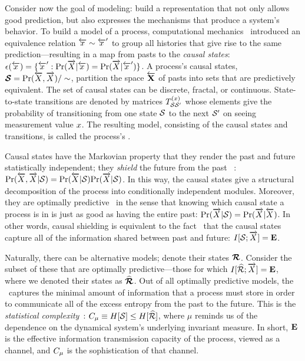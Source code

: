 \documentclass[prl,twocolumn,showpacs,superscriptaddress,preprintnumbers,floatfix]{revtex4}
\theoremstyle{plain}    \newtheorem{Lem}{Lemma}
\theoremstyle{plain}    \newtheorem*{ProLem}{Proof}
\theoremstyle{plain} 	\newtheorem{Cor}{Corollary}
\theoremstyle{plain} 	\newtheorem*{ProCor}{Proof}
\theoremstyle{plain} 	\newtheorem{The}{Theorem}
\theoremstyle{plain} 	\newtheorem*{ProThe}{Proof}
\theoremstyle{plain} 	\newtheorem{Prop}{Proposition}
\theoremstyle{plain} 	\newtheorem*{ProProp}{Proof}
\theoremstyle{plain} 	\newtheorem*{Conj}{Conjecture}
\theoremstyle{plain}	\newtheorem*{Rem}{Remark}
\theoremstyle{plain}	\newtheorem*{Def}{Definition}
\theoremstyle{plain}	\newtheorem*{Not}{Notation}
\begin{document}
Consider now the goal of modeling: build a representation that not only
allows good prediction, but also expresses the mechanisms that produce a
system's behavior. To build a model of a process,
computational mechanics~\cite{CompMechMerge} introduced an equivalence
relation ${\overleftarrow {{x}}} \sim {\overleftarrow { {x} }}^\prime$ to group all histories that give rise to the
same prediction---resulting in a map from pasts to the \emph{causal states}:
$\epsilon({\overleftarrow {{x}}}) =
  \{ {\overleftarrow {{x}}}^\prime: {\Pr}(\overrightarrow{{X}}|{\overleftarrow {{x}}}) = {\Pr}(\overrightarrow{{X}}|{\overleftarrow {{x}}}^\prime) \}$. 
A process's causal states, $\boldsymbol{\mathcal{S}} = {\Pr}(\overleftarrow {{X}},\overrightarrow{{X}}) / \sim$,
partition the space ${ \overleftarrow {\rm {\bf  {X} }} }$ of pasts into sets that are predictively
equivalent. The set of causal states can be discrete, fractal, or continuous.
State-to-state transitions are
denoted by matrices $T_{\mathcal{S} \mathcal{S}^\prime}^{(x)}$ whose elements
give the probability of transitioning from one state $\mathcal{S}$ to the
next $\mathcal{S}^\prime$ on seeing measurement value ${x}$. The
resulting model, consisting of the
causal states and transitions, is called the process's \emph{\eM}.
 
Causal states have the Markovian property that they render the past and future
statistically independent; they \emph{shield} the future from the past~%
\cite{CompMechMerge}:
${\Pr}(\overleftarrow {{X}},\overrightarrow{{X}}|\mathcal{S})
  = {\Pr}(\overleftarrow {{X}}|\mathcal{S}) {\Pr}(\overrightarrow{{X}}|\mathcal{S})$.
In this way, the causal states give a structural decomposition of
the process into conditionally independent modules.
Moreover, they are optimally predictive~\cite{CompMechMerge} in the sense that
knowing which causal state a process is in is just as good as having the
entire past: ${\Pr}(\overrightarrow{{X}}|\mathcal{S}) = {\Pr}(\overrightarrow{{X}}|\overleftarrow {{X}})$. In other
words, causal shielding is equivalent to the fact~\cite{CompMechMerge} that the
causal states capture all of the information shared between past and future:
$I[\mathcal{S};\overrightarrow{{X}}] = {\bf E}$.

Naturally, there can be alternative models; denote their states
$\boldsymbol{{\cal R}}$. Consider the subset of these that are optimally
predictive---those for which $I[\widehat{{\cal R}};\overrightarrow{{X}}] = {\bf E}$, where we
denoted their states as $\boldsymbol{\widehat{{\cal R}}}$. Out of all optimally predictive
models, the \eM\ captures the minimal amount of information that a process must
store in order to communicate all of the excess entropy from the past to the
future. This is the \emph{statistical complexity}~\cite{CompMechMerge}: 
${C_\mu} \equiv H[\mathcal{S}] \leq H[\widehat{{\cal R}}]$, where $\mu$ reminds 
us of the dependence on the dynamical system's underlying invariant measure. 
In short, ${\bf E}$ is the effective information transmission capacity of the
process, viewed as a channel, and ${C_\mu}$ is the sophistication of that channel.
\end{document}
